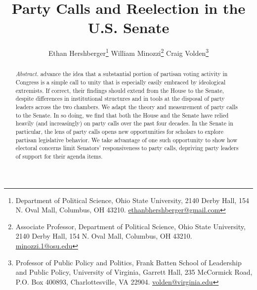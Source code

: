 \documentclass[12pt]{article}
\begin{document}
\title{\vspace{4em} \LARGE Party Calls and Reelection in the U.S. Senate}

\author{\large
Ethan Hershberger\footnote{
  \normalsize Department of Political Science,
  Ohio State University, 2140 Derby Hall, 154 N. Oval Mall, Columbus, OH 43210.
  \href{mailto:ethanbhershberger@gmail.com}{ethanbhershberger@gmail.com}
}\quad
William Minozzi\footnote{
  \normalsize Associate Professor, Department of Political Science,
  Ohio State University, 2140 Derby Hall, 154 N. Oval Mall, Columbus, OH 43210.
  \href{mailto:minozzi.1@osu.edu}{minozzi.1@osu.edu}
}\quad
Craig Volden\footnote{
  \normalsize Professor of Public Policy and Politics, Frank Batten School of
  Leadership and Public Policy,
  University of Virginia, Garrett Hall, 235 McCormick Road, P.O. Box 400893,
  Charlottesville, VA 22904.
  \href{mailto:volden@virginia.edu}{volden@virginia.edu}
}\\
}

\maketitle

\thispagestyle{empty}
\setcounter{page}{0}

\clearpage

\thispagestyle{empty}
\setcounter{page}{0}

\doublespacing

\renewcommand{\abstractname}{}
\begin{abstract}
\noindent \textit{Abstract.}
\noindent
\cite{Minozzi:2013} advance the idea that a substantial portion of partisan
voting activity in Congress is a simple call to unity that is especially easily
embraced by ideological extremists.
If correct, their findings should extend from the House to the Senate, despite
differences in institutional structures and in tools at the disposal of party
leaders across the two chambers.
We adapt the theory and measurement of party calls to the Senate.
In so doing, we find that both the House and the Senate have relied heavily
(and increasingly) on party calls over the past four decades.
In the Senate in particular, the lens of party calls opens new opportunities
for scholars to explore partisan legislative behavior.
We take advantage of one such opportunity to show how electoral concerns limit
Senators' responsiveness to party calls, depriving party leaders of support for
their agenda items.
\end{abstract}
\end{document}
